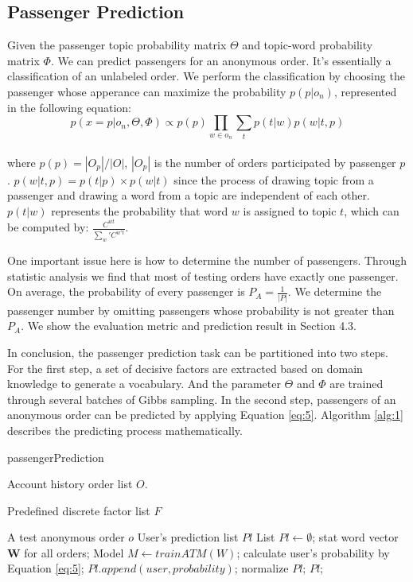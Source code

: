 \documentclass{llncs}
\begin{document}
\subsection{Passenger Prediction}
Given the passenger topic probability matrix $\Theta$ and topic-word probability matrix $\Phi$. We can predict passengers for an anonymous order. It's essentially a classification of an unlabeled order\cite{shanshan:unpopular}. We perform the classification by choosing the passenger whose apperance can maximize the probability $p(p|o_n)$, represented in the following equation:\\
\begin{equation}
\label{eq:5}
p(x=p|o_n,\Theta,\Phi) \propto p(p)\prod_{w \in o_n}\sum_t p(t|w)p(w|t,p)
\end{equation}\\
where $p(p) = |O_p| / |O|$, $|O_p|$ is the number of orders participated by passenger $p$. $p(w|t,p) = p(t|p) \times p(w|t)$ since the process of drawing topic from a passenger and drawing a word from a topic are independent of each other. $p(t|w)$ represents the probability that word $w$ is assigned to topic $t$, which can be computed by: $\frac{C^{wt}}{\sum_w'C^{w't}}$.\par
One important issue here is how to determine the number of passengers. Through statistic analysis we find that most of testing orders have exactly one passenger. On average, the probability of every passenger is $P_A = \frac{1}{|P|}$. We determine the passenger number by omitting passengers whose probability is not greater than $P_A$. We show the evaluation metric and prediction result in Section 4.3.\par
In conclusion, the passenger prediction task can be partitioned into two steps. For the first step, a set of decisive factors are extracted based on domain  knowledge to generate a vocabulary. And the parameter $\Theta$ and $\Phi$ are trained through several batches of Gibbs sampling. In the second step, passengers of an anonymous order can be predicted by applying Equation \ref{eq:5}. Algorithm \ref{alg:1} describes the predicting process mathematically.\par


\begin{algorithm}[htb]
\caption{passengerPrediction}
\begin{algorithmic}[1]
\label{alg:1}
\REQUIRE
Account history order list $O$. \par
Predefined discrete factor list $F$ \par
A test anonymous order $o$
\ENSURE 
User's prediction list $Pl$
\STATE List $Pl \leftarrow \emptyset$;
\STATE stat word vector $\mathbf{W}$ for all orders;
\STATE Model $M \leftarrow trainATM(W)$;
\STATE calculate user's probability by Equation \ref{eq:5};
\STATE $Pl.append(user,probability)$;
\ENDIF
\ENDFOR
\STATE normalize $Pl$;
\RETURN $Pl$;
\end{algorithmic} 
\end{algorithm}
\end{document}
